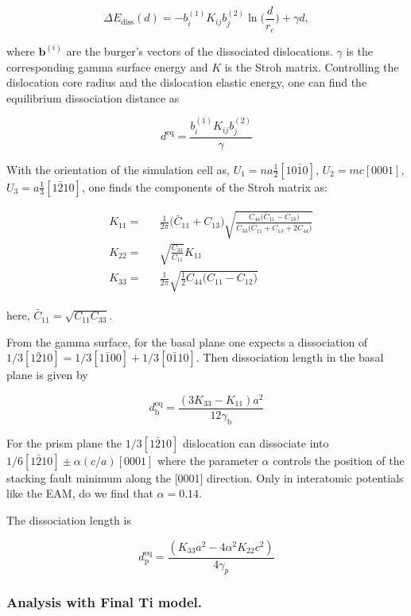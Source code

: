 \documentclass[11pt]{article}
\begin{document}
\[ \Delta E_{\text{diss}}(d) = - b_i^{(1)}K_{ij}b_j^{(2)}\ln \big( \frac{d}{r_c}
   \big) + \gamma d,  \]

where \(\mathbf{b}^{(i)}\) are the burger's vectors of the dissociated
dislocations.  \(\gamma\) is the corresponding gamma surface energy and
\(K\) is the Stroh matrix. Controlling the dislocation core radius
and the dislocation elastic energy, one can find the equilibrium
dissociation distance as 

\[
   d^{\text{eq}} = \frac{ b_i^{(1)}K_{ij}b_j^{(2) }}{\gamma}
   \]


With the orientation of the simulation cell as, \(U_1 = na \frac{1}{2} [10\bar{1}0]\), \(U_2 = mc [0001]\), 
 \(U_3 =  a \frac{1}{3} [1\bar{2}10]\), one finds the components of
 the Stroh matrix as:

\begin{align}
&K_{11} =& &\frac{1}{2\pi} \big( \bar{C}_{11} + C_{13} \big)
      \sqrt{ \frac{ C_{44} \big( \bar{C}_{11} - C_{13} \big)  }{
	      C_{33} \big( \bar{C}_{11} + C_{13} + 2C_{44} \big)  } 
	   }
\\    
&K_{22 }=& &\sqrt{ \frac{ C_{33} }{ C_{11} }  } K_{11}
\\
&K_{33} =& &\frac{1}{2\pi} \sqrt{ \frac{1}{2} C_{44} \big( C_{11} - C_{12} \big)  }_{}
\end{align}

here, \(\bar{C}_{11} = \sqrt{ C_{11}C_{33} }\).


From the gamma surface, for the basal plane one expects a
dissociation of \(1/3[1\bar{2}10] = 1/3[1\bar{1}00] +
    1/3[0\bar{1}10]\). Then dissociation length in the basal plane is
given by 

\[
    d_{\text{b}}^{\text{eq}} = \frac{ ( 3K_{33} - K_{11} ) a^2 }{ 12 \gamma_{\text{b}} } 
    \]

For the prism plane the \(1/3[1\bar{2}10]\) dislocation can
dissociate into \(1/6[1\bar{2}10] \pm \alpha(c/a)[0001]\) where the
parameter \(\alpha\) controls the position of the stacking fault minimum
along the [0001] direction. Only in interatomic potentials like
the EAM, do we find that \(\alpha = 0.14\). 

The dissociation length is 

\[
    d_{\text{p}}^{\text{eq}} = \frac{ ( K_{33}a^2 - 4 \alpha^2 K_{22} c^2 ) }{ 4 \gamma_{p} }
    \]



\subsubsection{Analysis with Final Ti model.}
\label{sec:orgff20b2f}
\end{document}
